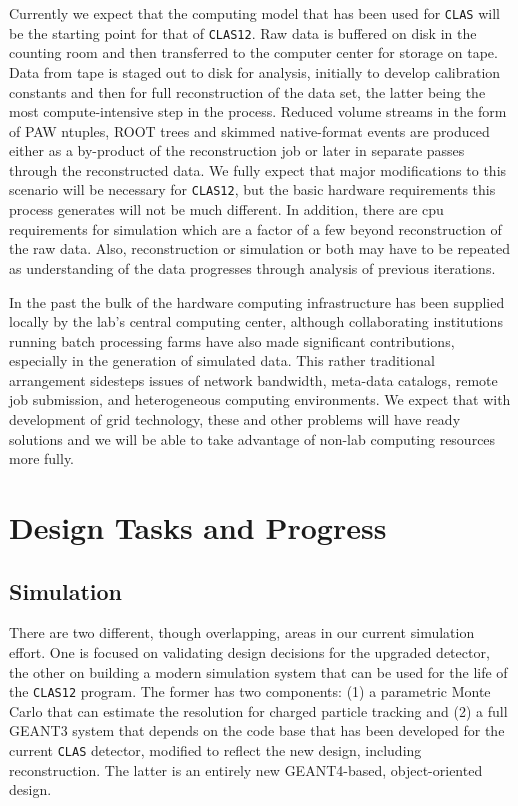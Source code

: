 Currently we expect that the computing model that has been used for 
{\tt CLAS} will be the starting point for that of {\tt CLAS12}.  Raw data 
is buffered on disk in the counting room and then transferred to the 
computer center for storage on tape.  Data from tape is staged out to disk 
for analysis, initially to develop calibration constants and then for full 
reconstruction of the data set, the latter being the most compute-intensive 
step in the process. Reduced volume streams in the form of PAW ntuples, 
ROOT trees and skimmed native-format events are produced either as a 
by-product of the reconstruction job or later in separate passes through 
the reconstructed data. We fully expect that major modifications to this 
scenario will be necessary for {\tt CLAS12}, but the basic hardware 
requirements this process generates will not be much different. In addition, 
there are cpu requirements for simulation which are a factor of a few beyond 
reconstruction of the raw data.  Also, reconstruction or simulation or both 
may have to be repeated as understanding of the data progresses through 
analysis of previous iterations.

In the past the bulk of the hardware computing infrastructure has been 
supplied locally by the lab's central computing center, although collaborating 
institutions running batch processing farms have also made significant 
contributions, especially in the generation of simulated data. This rather 
traditional arrangement sidesteps issues of network bandwidth, meta-data 
catalogs, remote job submission, and heterogeneous computing environments. 
We expect that with development of grid technology, these and other problems 
will have ready solutions and we will be able to take advantage of non-lab 
computing resources more fully.

\section{Design Tasks and Progress}

\subsection{Simulation}

There are two different, though overlapping, areas in our current simulation 
effort. One is focused on validating design decisions for the upgraded 
detector, the other on building a modern simulation system that can be used 
for the life of the {\tt CLAS12} program. The former has two components: (1) a 
parametric Monte Carlo that can estimate the resolution for charged particle 
tracking and (2) a full GEANT3 system that depends on the code base that has 
been developed for the current {\tt CLAS} detector, modified to reflect the 
new design, including reconstruction. The latter is an entirely new 
GEANT4-based, object-oriented design.

